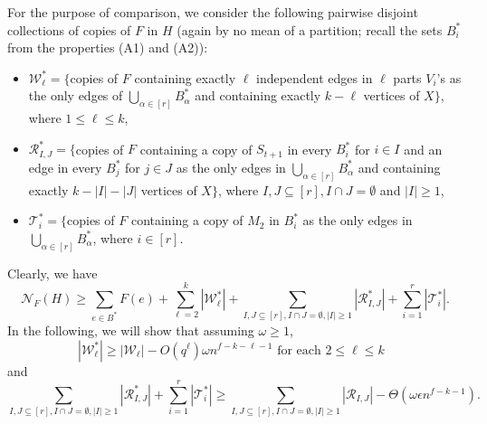 \documentclass[10pt]{article}
\begin{document}
For the purpose of comparison, we consider the following pairwise disjoint collections of copies of $F$ in $H$ (again by no mean of a partition;
recall the sets $B^\ast_{i}$ from the properties (A1) and (A2)):
\begin{itemize}
\item  $\mathcal{W}^\ast_\ell=\{$copies of $F$ containing exactly $\ell$ independent edges in $\ell$ parts $V_i$'s as the only edges of $\bigcup_{\alpha\in [r]} B_\alpha^\ast$ and containing exactly $k-\ell$ vertices of $X\}$, where $1\leq \ell\leq k$,
\item  $\mathcal{R}^\ast_{I,J}=\{$copies of $F$ containing a copy of $S_{t+1}$ in every $B^\ast_{i}$ for $i\in I$ and an edge in every $B^\ast_{j}$ for $j\in J$ as the only edges in $\bigcup_{\alpha\in [r]} B_\alpha^\ast$ and containing exactly $k-|I|-|J|$ vertices of $X\}$, where $I,J\subseteq [r],I\cap J=\emptyset$ and $|I|\geq 1$,
\item  $\mathcal{T}^\ast_i=\{$copies of $F$ containing a copy of $M_2$ in $B^\ast_i$ as the only edges in $\bigcup_{\alpha\in [r]} B_\alpha^\ast$, where $i\in [r]$.
\end{itemize}
Clearly, we have
\begin{equation}\label{eq-for-compare2}
\mathcal{N}_F(H)\geq \sum_{e\in B^\ast}F(e)+\sum_{\ell=2}^{k}|\mathcal{W}^\ast_\ell|+\sum_{I,J\subseteq [r],I\cap J=\emptyset, |I|\geq 1}|\mathcal{R}^\ast_{I,J}|+\sum_{i=1}^{r}|\mathcal{T}^\ast_i|.
\end{equation}
In the following, we will show that assuming $\omega\geq 1$,
\begin{equation}\label{eq add 1}
|\mathcal{W}^\ast_\ell|\geq |\mathcal{W}_\ell|- O(q^\ell)\omega n^{f-k-\ell-1} \mbox{ for each $2\leq \ell\leq k$ }
\end{equation}
and
\begin{equation}\label{eq add 2}
\sum_{I,J\subseteq [r],I\cap J=\emptyset, |I|\geq 1}|\mathcal{R}^\ast_{I,J}|+\sum_{i=1}^{r}|\mathcal{T}^\ast_i|\geq \sum_{I,J\subseteq [r],I\cap J=\emptyset, |I|\geq 1}|\mathcal{R}_{I,J}|-\Theta(\omega \epsilon n^{f-k-1}).
\end{equation}
\end{document}
